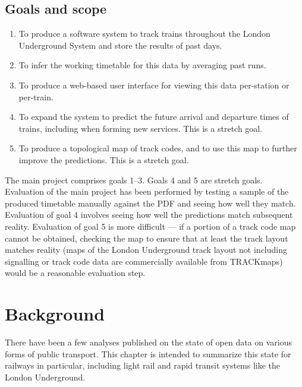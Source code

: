 \documentclass[a4paper,12pt,twoside]{report}
\begin{document}
\section{Goals and scope}

\begin{enumerate}
  \item To produce a software system to track trains throughout the London
    Underground System and store the results of past days.
  \item To infer the working timetable for this data by averaging past runs.
  \item To produce a web-based user interface for viewing this data per-station
    or per-train.
  \item To expand the system to predict the future arrival and departure times
    of trains, including when forming new services. This is a stretch goal.
  \item To produce a topological map of track codes, and to use this map to
    further improve the predictions. This is a stretch goal.
\end{enumerate}

The main project comprises goals 1--3. Goals 4 and 5 are stretch goals.
Evaluation of the main project has been performed by testing a sample of the
produced timetable manually against the PDF and seeing how well they match.
Evaluation of goal 4 involves seeing how well the predictions match subsequent
reality. Evaluation of goal 5 is more difficult --- if a portion of a track
code map cannot be obtained, checking the map to ensure that at least the track
layout matches reality (maps of the London Underground track layout not
including signalling or track code data are commercially available from
TRACKmaps\cite{TRACKmaps5}) would be a reasonable evaluation step.

\chapter{Background}

There have been a few analyses published on the state of open data on various
forms of public transport. This chapter is intended to summarize this state for
railways in particular, including light rail and rapid transit systems like the
London Underground.
\end{document}
